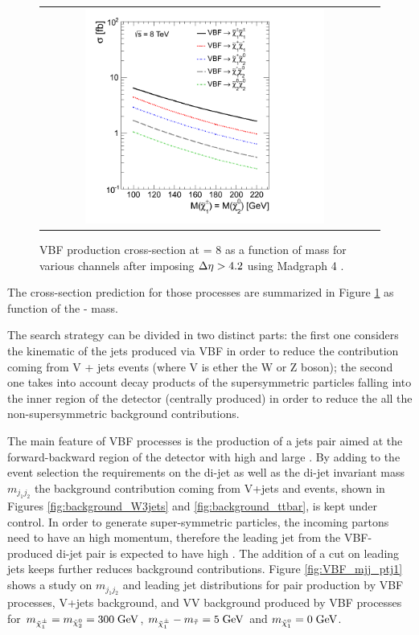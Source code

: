 \begin{figure}[tbh!]
	\centering
	\begin{tabular}{cc}
		\includegraphics[width=0.75\textwidth]{analysis/pics/VBFXsection.png}
	\end{tabular}
	\caption{VBF production cross-section at \CM = 8 \tev as a function of mass for various channels after imposing \ensuremath{\deltaeta > 4.2} using Madgraph 4 \cite{Dutta:2012xe}.}
	\label{fig:VBF_xsec}
\end{figure}

The cross-section prediction for those processes are summarized in Figure \ref{fig:VBF_xsec} as function of the \charginomp - \neutralinotwo mass.

The search strategy can be divided in two distinct parts: the first one considers the kinematic of the jets produced via VBF in order to reduce the contribution coming  from V + jets events (where V is ether the W or Z boson); the second one takes into account decay products of the supersymmetric particles falling into the inner region of the detector (centrally produced) in order to reduce the all the non-supersymmetric background contributions.

The main feature of VBF processes is the production of a jets pair aimed at the forward-backward region of the detector with high \pt and large \deltaeta. By adding to the event selection the requirements on the di-jet \deltaeta as well as the di-jet invariant mass \ensuremath{m_{j_{1}j_{2}}} the background contribution coming from V+jets and \ttbar events, shown in Figures \ref{fig:background_W3jets} and \ref{fig:background_ttbar}, is kept under control. In order to generate super-symmetric particles, the incoming partons need to have an high momentum, therefore the leading jet from the VBF-produced di-jet pair is expected to have high \pt. The addition of a \pt cut on leading jets keeps further reduces background contributions. Figure \ref{fig:VBF_mjj_ptj1} shows a study on \ensuremath{m_{j_{1}j_{2}}} and leading jet \pt distributions for \charginopm \charginopm pair production by VBF processes, V+jets background, and VV background produced by VBF processes for \ensuremath{m_{\charginopm} = m_{\neutralinotwo} = 300\gev}, \ensuremath{m_{\charginopm} - m_{\tilde{\tau}} = 5\gev} and \ensuremath{m_{\neutralinoone} = 0\gev}.

